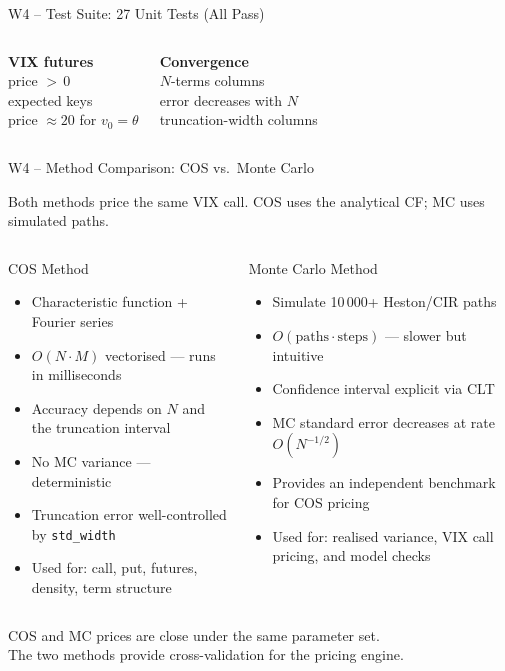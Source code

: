 \documentclass[aspectratio=169, 11pt]{beamer}
\begin{document}
\begin{frame}{W4 -- Test Suite: 27 Unit Tests (All Pass)}
\begin{columns}[T]
\medskip
\textbf{VIX futures}\\
\checkmark\; price ${>}\,0$\\
\checkmark\; expected keys\\
\checkmark\; price $\approx 20$ for $v_0=\theta$

\medskip
\textbf{Convergence}\\
\checkmark\; $N$-terms columns\\
\checkmark\; error decreases with $N$\\
\checkmark\; truncation-width columns

\end{columns}
\end{frame}

\begin{frame}{W4 -- Method Comparison: COS vs.\ Monte Carlo}

Both methods price the same VIX call. COS uses the analytical CF; MC uses simulated paths.

\begin{columns}[T]
\begin{block}{COS Method}
\begin{itemize}\small
  \item Characteristic function + Fourier series
  \item $O(N\cdot M)$ vectorised --- runs in milliseconds
  \item Accuracy depends on $N$ and the truncation interval
  \item No MC variance --- deterministic
  \item Truncation error well-controlled by \texttt{std\_width}
  \item Used for: call, put, futures, density, term structure
\end{itemize}
\end{block}

\begin{block}{Monte Carlo Method}
\begin{itemize}\small
  \item Simulate 10\,000+ Heston/CIR paths
  \item $O(\text{paths}\cdot\text{steps})$ --- slower but intuitive
  \item Confidence interval explicit via CLT
  \item MC standard error decreases at rate $O(N^{-1/2})$
  \item Provides an independent benchmark for COS pricing
  \item Used for: realised variance, VIX call pricing, and model checks
\end{itemize}
\end{block}
\end{columns}

\vspace{6pt}
\centering
COS and MC prices are close under the same parameter set.\\[2pt]
The two methods provide cross-validation for the pricing engine.
\end{frame}
\end{document}
